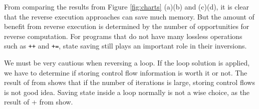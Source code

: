 From comparing the results from Figure \ref{fig:charts} (a)(b) and (c)(d), it is clear that the reverse execution approaches can save much memory. 
But the amount of benefit from reverse execution is determined by the number of opportunities for reverse computation. 
For programs that do not have many lossless operations such as \texttt{++} and \texttt{+=}, state saving still plays an important role in their inversions.

We must be very cautious when reversing a loop. If the loop solution is applied, we have to determine if storing control flow information is worth it or not.
The result of \Loopb from \RCC shows that if the number of iterations is large, storing control flows is not good idea. 
Saving state inside a loop normally is not a wise choice, as the result of \Loopa+ \Asn from \RCC show.





